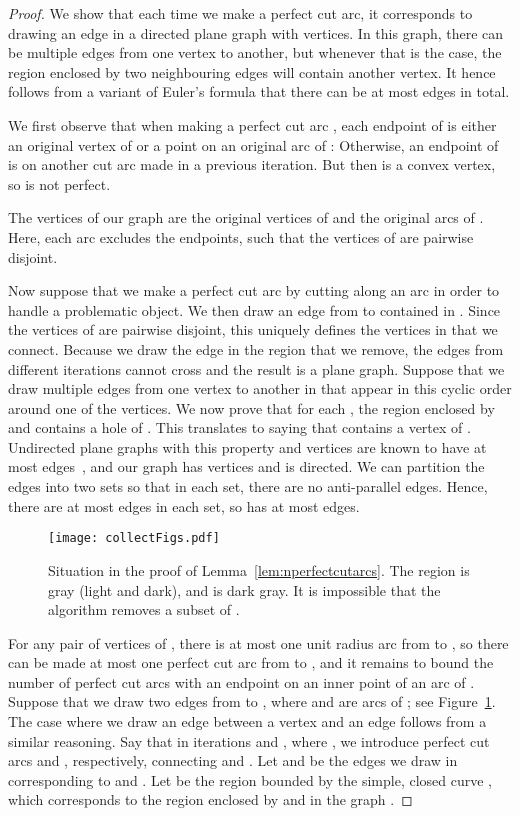 \documentclass{article}
\begin{document}
\begin{proof}
We show that each time we make a perfect cut arc, it corresponds to drawing an edge in a directed plane graph  with  vertices.
In this graph, there can be multiple edges from one vertex to another, but whenever that is the case, the region enclosed by two neighbouring edges will contain another vertex.
It hence follows from a variant of Euler's formula that there can be at most  edges in total.

We first observe that when making a perfect cut arc , each endpoint of  is either an original vertex of  or a point on an original arc of :
Otherwise, an endpoint  of  is on another cut arc made in a previous iteration.
But then  is a convex vertex, so  is not perfect.

The vertices of our graph  are the original vertices of  and the original arcs of .
Here, each arc excludes the endpoints, such that the vertices of  are pairwise disjoint.

Now suppose that we make a perfect cut arc  by cutting along an arc  in order to handle a problematic object.
We then draw an edge from  to  contained in .
Since the vertices of  are pairwise disjoint, this uniquely defines the vertices in  that we connect.
Because we draw the edge in the region  that we remove, the edges from different iterations cannot cross and the result is a plane graph.
Suppose that we draw multiple edges  from one vertex to another in  that appear in this cyclic order around one of the vertices.
We now prove that for each , the region  enclosed by  and  contains a hole of .
This translates to saying that  contains a vertex of .
Undirected plane graphs with this property and  vertices are known to have at most  edges~\cite{abrahamsen2020tiling}, and our graph  has  vertices and is directed.
We can partition the edges into two sets so that in each set, there are no anti-parallel edges.
Hence, there are at most  edges in each set, so  has at most  edges.

\begin{figure}
\centering
\texttt{[image: collectFigs.pdf]}
\caption{Situation in the proof of Lemma~\ref{lem:nperfectcutarcs}.
The region  is gray (light and dark), and  is dark gray.
It is impossible that the algorithm removes a subset  of .}
\label{fig:nottwoarcs}
\end{figure}

For any pair of vertices  of , there is at most one unit radius arc from  to , so there can be made at most one perfect cut arc from  to , and it remains to bound the number of perfect cut arcs with an endpoint on an inner point of an arc of .
Suppose that we draw two edges from  to , where  and  are arcs of ; see Figure~\ref{fig:nottwoarcs}.
The case where we draw an edge between a vertex and an edge follows from a similar reasoning.
Say that in iterations  and , where , we introduce perfect cut arcs  and , respectively, connecting  and .
Let  and  be the edges we draw in  corresponding to  and .
Let  be the region bounded by the simple, closed curve , which corresponds to the region enclosed by  and  in the graph .


\end{proof}
\end{document}
